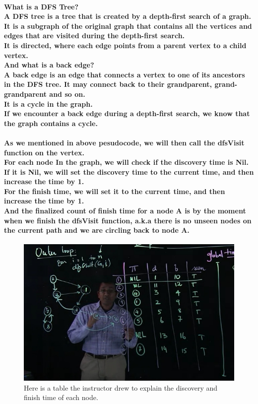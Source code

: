 \documentclass{article}
\begin{document}
\paragraph{
    What is a DFS Tree?\\
    A DFS tree is a tree that is created by a depth-first search of a graph.\\
    It is a subgraph of the original graph that contains all the vertices and edges that are visited 
    during the depth-first search.\\
    It is directed, where each edge points from a parent vertex to a child vertex.\\
    And what is a back edge?\\
    A back edge is an edge that connects a vertex to one of its ancestors in the DFS tree. 
    It may connect back to their grandparent, grand-grandparent and so on.\\
    It is a cycle in the graph.\\
    If we encounter a back edge during a depth-first search, we know that the graph contains a cycle.\\
}

\paragraph{
    As we mentioned in above pesudocode, we will then call the dfsVisit function on the vertex.\\
    For each node In the graph, we will check if the discovery time is Nil.\\
    If it is Nil, we will set the discovery time to the current time, and then increase the time by 1.\\
    For the finish time, we will set it to the current time, and then increase the time by 1.\\
    And the finalized count of finish time for a node A is by the moment when we finish the dfsVisit function, 
    a.k.a there is no unseen nodes on the current path and we are circling back to node A.\\
}

\begin{figure}[H]
    \includegraphics[width=\textwidth]{dfstable.png}
    \caption{Here is a table the instructor drew to explain the discovery and finish time of each node.}
\end{figure}
\end{document}

